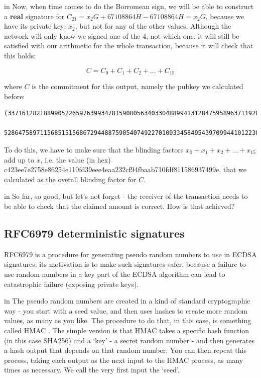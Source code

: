 \documentclass[10pt,a4paper]{article}
\begin{document}
 in \noindent Now, when time comes to do the Borromean sign, we will be able to construct a \textbf{real} signature for $C_{21} = x_{2}G + 67108864H - 67108864H = x_{2}G$, because we have its private key: $x_{2}$, but not for any of the other values. Although the network will only know we signed one of the 4, not which one, it will still be satisfied with our arithmetic for the whole transaction, because it will check that this holds:

\[C = C_{0} + C_{1} + C_{2} + \ldots + C_{15}\]

where $C$ is the commitment for this output, namely the pubkey we calculated before:

\begin{verbatim}
(33716128218899052265976399347815908056340330488994131284759589637119207433518L,
   52864758971156851515686729448875905407492270100334584954397099441012230985012L)
\end{verbatim}

To do this, we have to make sure that the blinding factors $x_{0} + x_{1} + x_{2} + \ldots + x_{15}$ add up to $x$, i.e. the value (in hex) c423ee7e2758e86254e110fd39eee4eaa232cf94fbaab710fdf811586937499e, that we calculated as the overall blinding factor for $C$.

 in \noindent So far, so good, but let's not forget - the receiver of the transaction needs to be able to check that the claimed amount is correct. How is that achieved?

\subsection{RFC6979 deterministic signatures}

RFC6979 \cite{rfc6979} is a procedure for generating pseudo random numbers to use in ECDSA signatures; its motivation is to make such signatures safer, because a failure to use random numbers in a key part of the ECDSA algorithm can lead to catastrophic failure (exposing private keys).

 in \noindent The pseudo random numbers are created in a kind of standard cryptographic way - you start with a seed value, and then uses hashes to create more random values, as many as you like. The procedure to do that, in this case, is something called HMAC \cite{hmac}. The simple version is that HMAC takes a specific hash function (in this case SHA256) and a `key' - a secret random number - and then generates a hash output that depends on that random number. You can then repeat this process, taking each output as the next input to the HMAC process, as many times as necessary. We call the very first input the `seed'.
\end{document}

